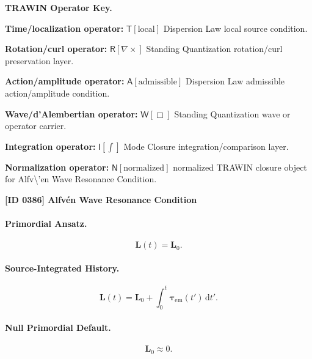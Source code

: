 \par\vspace{0.45\baselineskip}
\noindent\begin{minipage}[t]{\linewidth}
\begingroup
\small
\raggedright
\textbf{TRAWIN Operator Key.}\par
\noindent\textbf{Time/localization operator:} $\mathsf{T}\!\left[\mathrm{local}\right]$ Dispersion Law local source condition.\par
\noindent\textbf{Rotation/curl operator:} $\mathsf{R}\!\left[\nabla\times\right]$ Standing Quantization rotation/curl preservation layer.\par
\noindent\textbf{Action/amplitude operator:} $\mathsf{A}\!\left[\mathrm{admissible}\right]$ Dispersion Law admissible action/amplitude condition.\par
\noindent\textbf{Wave/d'Alembertian operator:} $\mathsf{W}\!\left[\Box\right]$ Standing Quantization wave or operator carrier.\par
\noindent\textbf{Integration operator:} $\mathsf{I}\!\left[\int\right]$ Mode Closure integration/comparison layer.\par
\noindent\textbf{Normalization operator:} $\mathsf{N}\!\left[\mathrm{normalized}\right]$ normalized TRAWIN closure object for Alfv\textbackslash{}'en Wave Resonance Condition.\par
\endgroup
\end{minipage}

\clearpage
\noindent\textbf{[ID 0386] Alfv\'en Wave Resonance Condition}\par
\vspace{0.35em}
\paragraph{Primordial Ansatz.}
\begin{equation}
\mathbf{L}(t)=\mathbf{L}_0 .
\end{equation}

\paragraph{Source-Integrated History.}
\begin{equation}
\mathbf{L}(t)
=
\mathbf{L}_0
+
\int_0^t
\boldsymbol{\tau}_{\mathrm{em}}(t')
\,\mathrm{d}t' .
\end{equation}

\paragraph{Null Primordial Default.}
\begin{equation}
\mathbf{L}_0\approx 0 .
\end{equation}

